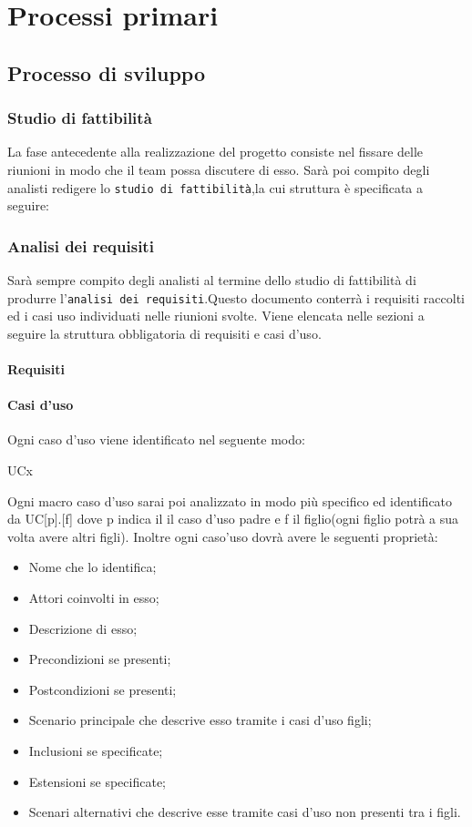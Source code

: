 \section{Processi primari}

\subsection{Processo di sviluppo}

	\subsubsection{Studio di fattibilità}
	La fase antecedente alla realizzazione del progetto consiste nel fissare delle riunioni in modo che il team possa discutere di esso. Sarà poi compito degli analisti redigere lo \texttt{studio di fattibilità},la cui struttura è specificata a seguire: %
	\subsubsection{Analisi dei requisiti}
	Sarà sempre compito degli analisti al termine dello studio di fattibilità di produrre l'\texttt{analisi dei requisiti}.Questo documento conterrà i requisiti raccolti ed i casi uso individuati nelle riunioni svolte.
	Viene elencata nelle sezioni a seguire la struttura obbligatoria di requisiti e casi d'uso.
		\paragraph{Requisiti}
		\paragraph{Casi d'uso}
		Ogni caso d'uso viene identificato nel seguente modo:
		\centerline{UCx}
		Ogni macro caso d'uso sarai poi analizzato in modo più specifico ed identificato da UC[p].[f] dove p indica il il caso d'uso padre e f il figlio(ogni figlio potrà a sua volta avere altri figli).
		Inoltre ogni caso'uso dovrà avere le seguenti proprietà:
		\begin{itemize}
		\item Nome che lo identifica;
		\item Attori coinvolti in esso;
		\item Descrizione di esso;
		\item Precondizioni se presenti;
		\item Postcondizioni se presenti;
		\item Scenario principale che descrive esso tramite i casi d'uso figli;
		\item Inclusioni se specificate;
		\item Estensioni se specificate;
		\item Scenari alternativi che descrive esse tramite casi d'uso non presenti tra i figli.
		\end{itemize}
